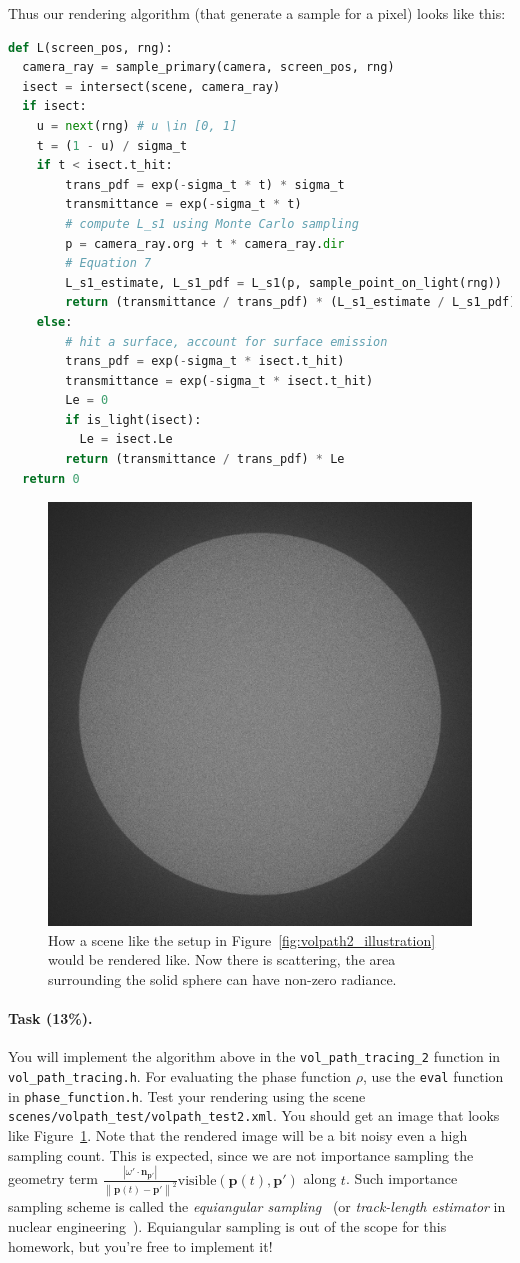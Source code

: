Thus our rendering algorithm (that generate a sample for a pixel) looks like this:
\begin{lstlisting}[language=python]
def L(screen_pos, rng):
  camera_ray = sample_primary(camera, screen_pos, rng)
  isect = intersect(scene, camera_ray)
  if isect:
    u = next(rng) # u \in [0, 1]
    t = (1 - u) / sigma_t
    if t < isect.t_hit:
        trans_pdf = exp(-sigma_t * t) * sigma_t
        transmittance = exp(-sigma_t * t)
        # compute L_s1 using Monte Carlo sampling
        p = camera_ray.org + t * camera_ray.dir
        # Equation 7
        L_s1_estimate, L_s1_pdf = L_s1(p, sample_point_on_light(rng))
        return (transmittance / trans_pdf) * (L_s1_estimate / L_s1_pdf)
    else:
        # hit a surface, account for surface emission
        trans_pdf = exp(-sigma_t * isect.t_hit)
        transmittance = exp(-sigma_t * isect.t_hit)
        Le = 0
        if is_light(isect):
          Le = isect.Le
        return (transmittance / trans_pdf) * Le
  return 0
\end{lstlisting}

\begin{figure}
\centering
\includegraphics[width=0.5\linewidth]{imgs/volpath_2.png}
\caption{How a scene like the setup in Figure~\ref{fig:volpath2_illustration} would be rendered like. Now there is scattering, the area surrounding the solid sphere can have non-zero radiance.}
\label{fig:volpath2}
\end{figure}

\paragraph{Task (13\%).} You will implement the algorithm above in the \lstinline{vol_path_tracing_2} function in \lstinline{vol_path_tracing.h}. For evaluating the phase function $\rho$, use the \lstinline{eval} function in \lstinline{phase_function.h}.
Test your rendering using the scene \lstinline{scenes/volpath_test/volpath_test2.xml}. You should get an image that looks like Figure~\ref{fig:volpath2}. Note that the rendered image will be a bit noisy even a high sampling count. This is expected, since we are not importance sampling the geometry term $\frac{\left| \omega' \cdot \mathbf{n}_{\mathbf{p}'} \right|}{{\left\| \mathbf{p}(t) - \mathbf{p}' \right\|}^2} \text{visible}(\mathbf{p}(t), \mathbf{p}')$ along $t$. Such importance sampling scheme is called the \emph{equiangular sampling}~\cite{Kulla:2012:IST} (or \emph{track-length estimator} in nuclear engineering~\cite{Rief:1984:TLE}). Equiangular sampling is out of the scope for this homework, but you're free to implement it!

